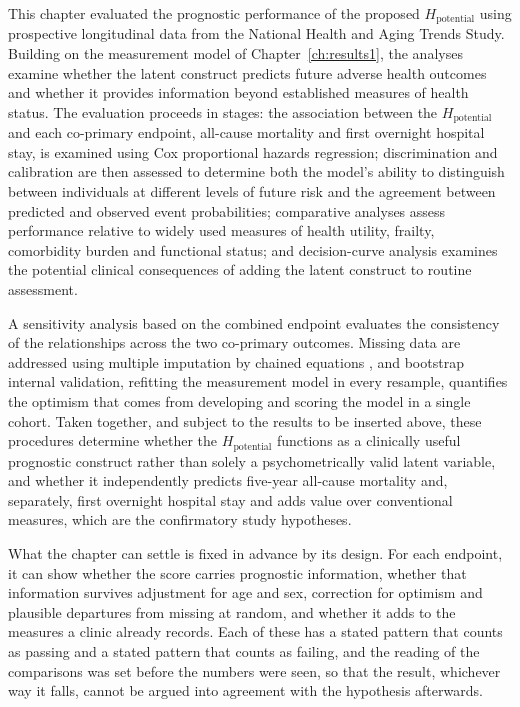 \noindent This chapter evaluated the prognostic performance of the proposed $H_{\text{potential}}$ using prospective longitudinal data from the National Health and Aging Trends Study. Building on the measurement model of Chapter~\ref{ch:results1}, the analyses examine whether the latent construct predicts future adverse health outcomes and whether it provides information beyond established measures of health status. The evaluation proceeds in stages: the association between the $H_{\text{potential}}$ and each co-primary endpoint, all-cause mortality and first overnight hospital stay, is examined using Cox proportional hazards regression; discrimination and calibration are then assessed to determine both the model's ability to distinguish between individuals at different levels of future risk and the agreement between predicted and observed event probabilities; comparative analyses assess performance relative to widely used measures of health utility, frailty, comorbidity burden and functional status; and decision-curve analysis examines the potential clinical consequences of adding the latent construct to routine assessment.

A sensitivity analysis based on the combined endpoint evaluates the consistency of the relationships across the two co-primary outcomes. Missing data are addressed using multiple imputation by chained equations \citep{vanbuuren_2011}, and bootstrap internal validation, refitting the measurement model in every resample, quantifies the optimism that comes from developing and scoring the model in a single cohort. Taken together, and subject to the results to be inserted above, these procedures determine whether the $H_{\text{potential}}$ functions as a clinically useful prognostic construct rather than solely a psychometrically valid latent variable, and whether it independently predicts five-year all-cause mortality and, separately, first overnight hospital stay and adds value over conventional measures, which are the confirmatory study hypotheses.

What the chapter can settle is fixed in advance by its design. For each endpoint, it can show whether the score carries prognostic information, whether that information survives adjustment for age and sex, correction for optimism and plausible departures from missing at random, and whether it adds to the measures a clinic already records. Each of these has a stated pattern that counts as passing and a stated pattern that counts as failing, and the reading of the comparisons was set before the numbers were seen, so that the result, whichever way it falls, cannot be argued into agreement with the hypothesis afterwards.

